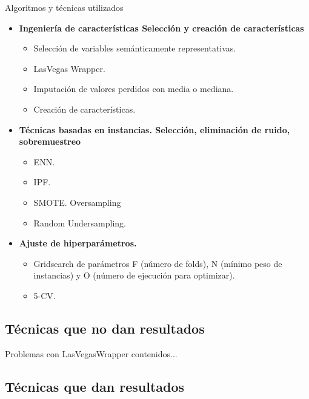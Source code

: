 \begin{frame}{Algoritmos y técnicas utilizados}
	\begin{itemize}
		\item \textbf{Ingeniería de características Selección y creación de características}
			\begin{itemize}
				\item Selección de variables semánticamente representativas. 
				\item LasVegas Wrapper. 
				\item Imputación de valores perdidos con media o mediana.
				\item Creación de características. \pause 
			\end{itemize}
		\item \textbf{Técnicas basadas en instancias. Selección, eliminación de ruido, sobremuestreo}
			\begin{itemize}
				\item ENN.
				\item IPF.
				\item SMOTE. Oversampling
				\item Random Undersampling. \pause 
			\end{itemize}
		\item \textbf{Ajuste de hiperparámetros.}
			\begin{itemize}
				\item Gridsearch de parámetros F (número de folds), N (mínimo peso de instancias) y O (número de ejecución para optimizar).
				\item 5-CV.
			\end{itemize}
	\end{itemize}
\end{frame}
\subsection{Técnicas que no dan resultados}
\begin{frame}{Problemas con LasVegasWrapper}
	contenidos...
\end{frame}

\subsection{Técnicas que dan resultados}


